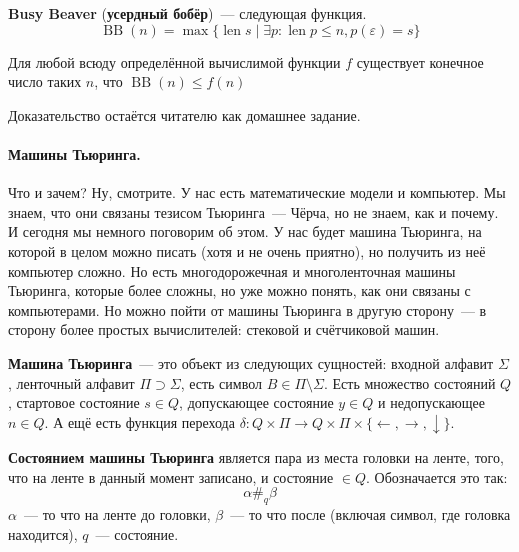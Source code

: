 \documentclass{article}
\begin{document}
    \begin{definition}
        \textbf{Busy Beaver} (\textbf{усердный бобёр})~--- следующая функция.
        $$
        \operatorname{BB}(n)=\max\{\operatorname{len}s\mid\exists p:\operatorname{len}p\leqslant n,p(\varepsilon)=s\}
        $$
    \end{definition}
    \begin{theorem}
        Для любой всюду определённой вычислимой функции $f$ существует конечное число таких $n$, что $\operatorname{BB}(n)\leqslant f(n)$
    \end{theorem}
    \begin{remark}
        Доказательство остаётся читателю как домашнее задание.
    \end{remark}
    \paragraph{Машины Тьюринга.}
    \begin{remark}
        Что и зачем? Ну, смотрите. У нас есть математические модели и компьютер. Мы знаем, что они связаны тезисом Тьюринга~--- Чёрча, но не знаем, как и почему. И сегодня мы немного поговорим об этом. У нас будет машина Тьюринга, на которой в целом можно писать (хотя и не очень приятно), но получить из неё компьютер сложно. Но есть многодорожечная и многоленточная машины Тьюринга, которые более сложны, но уже можно понять, как они связаны с компьютерами. Но можно пойти от машины Тьюринга в другую сторону~--- в сторону более простых вычислителей: стековой и счётчиковой машин.
    \end{remark}
    \begin{definition}
        \textbf{Машина Тьюринга}~--- это объект из следующих сущностей: входной алфавит $\Sigma$, ленточный алфавит $\Pi\supset\Sigma$, есть символ $B\in\Pi\setminus\Sigma$. Есть множество состояний $Q$, стартовое состояние $s\in Q$, допускающее состояние $y\in Q$ и недопускающее $n\in Q$. А ещё есть функция перехода $\delta\colon Q\times\Pi\to Q\times\Pi\times\{\leftarrow,\rightarrow,\downarrow\}$.
    \end{definition}
    \begin{definition}
        \textbf{Состоянием машины Тьюринга} является пара из места головки на ленте, того, что на ленте в данный момент записано, и состояние $\in Q$. Обозначается это так:
        $$
        \alpha\#_q\beta
        $$
        $\alpha$~--- то что на ленте до головки, $\beta$~--- то что после (включая символ, где головка находится), $q$~--- состояние.
    \end{definition}
\end{document}
